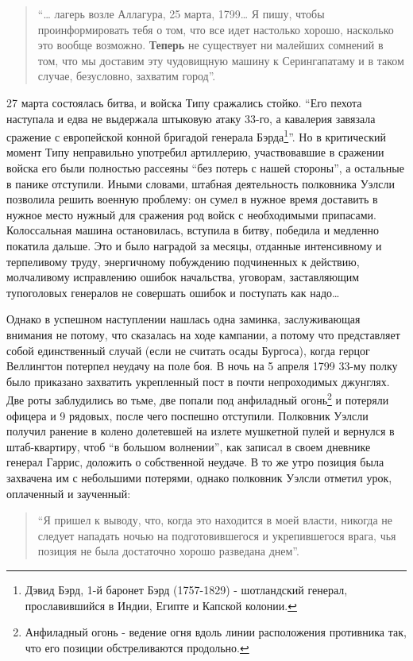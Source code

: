 \documentclass[
  oneside,
  12pt,
  titlepage]{book}
\begin{document}
\begin{quote}
``\ldots{} лагерь возле Аллагура, 25 марта, 1799\ldots{} Я пишу, чтобы проинформировать тебя о том, что все идет настолько хорошо, насколько это вообще возможно. \textbf{Теперь} не существует ни малейших сомнений в том, что мы доставим эту чудовищную машину к Серингапатаму и в таком случае, безусловно, захватим город''.
\end{quote}

27 марта состоялась битва, и войска Типу сражались стойко. ``Его пехота наступала и едва не выдержала штыковую атаку 33-го, а кавалерия завязала сражение с европейской конной бригадой генерала Бэрда\footnote{Дэвид Бэрд, 1-й баронет Бэрд (1757-1829) - шотландский генерал, прославившийся в Индии, Египте и Капской колонии.}''. Но в критический момент Типу неправильно употребил артиллерию, участвовавшие в сражении войска его были полностью рассеяны ``без потерь с нашей стороны'', а остальные в панике отступили. Иными словами, штабная деятельность полковника Уэлсли позволила решить военную проблему: он сумел в нужное время доставить в нужное место нужный для сражения род войск с необходимыми припасами. Колоссальная машина остановилась, вступила в битву, победила и медленно покатила дальше. Это и было наградой за месяцы, отданные интенсивному и терпеливому труду, энергичному побуждению подчиненных к действию, молчаливому исправлению ошибок начальства, уговорам, заставляющим тупоголовых генералов не совершать ошибок и поступать как надо\ldots{}

Однако в успешном наступлении нашлась одна заминка, заслуживающая внимания не потому, что сказалась на ходе кампании, а потому что представляет собой единственный случай (если не считать осады Бургоса), когда герцог Веллингтон потерпел неудачу на поле боя. В ночь на 5 апреля 1799 33-му полку было приказано захватить укрепленный пост в почти непроходимых джунглях. Две роты заблудились во тьме, две попали под анфиладный огонь\footnote{Анфиладный огонь - ведение огня вдоль линии расположения противника так, что его позиции обстреливаются продольно.} и потеряли офицера и 9 рядовых, после чего поспешно отступили. Полковник Уэлсли получил ранение в колено долетевшей на излете мушкетной пулей и вернулся в штаб-квартиру, чтоб ``в большом волнении'', как записал в своем дневнике генерал Гаррис, доложить о собственной неудаче. В то же утро позиция была захвачена им с небольшими потерями, однако полковник Уэлсли отметил урок, оплаченный и заученный:

\begin{quote}
``Я пришел к выводу, что, когда это находится в моей власти, никогда не следует нападать ночью на подготовившегося и укрепившегося врага, чья позиция не была достаточно хорошо разведана днем''.
\end{quote}
\end{document}
